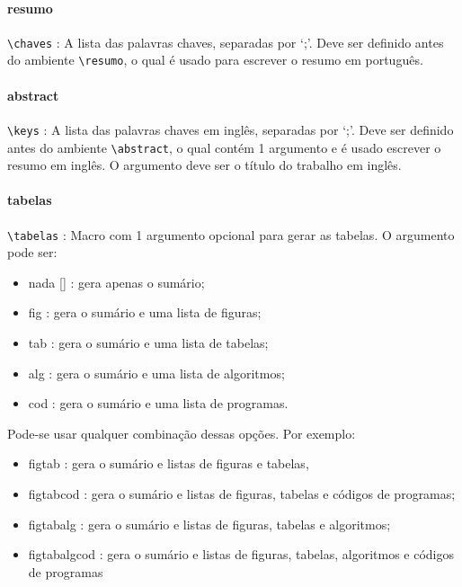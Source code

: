 \paragraph{resumo\\}
\verb|\chaves| : A lista das palavras chaves, separadas por `;'. Deve ser definido antes do ambiente \verb|\resumo|, o qual é usado para escrever o resumo em português.

\paragraph{abstract\\}
\verb|\keys| : A lista das palavras chaves em inglês, separadas por `;'. Deve ser definido antes do ambiente \verb|\abstract|, o qual contém 1 argumento e é usado escrever o resumo em inglês. O argumento deve ser o título do trabalho em inglês.

\paragraph{tabelas\\}
\verb|\tabelas| : Macro com 1 argumento opcional para gerar as tabelas. O argumento pode ser:
\begin{itemize}
 \item nada [] : gera apenas o sumário;
 \item \textsf{fig} : gera o sumário e uma lista de figuras;
 \item \textsf{tab} : gera o sumário e uma lista de tabelas;
 \item \textsf{alg} : gera o sumário e uma lista de algoritmos;
 \item \textsf{cod} : gera o sumário e uma lista de programas.
\end{itemize}

Pode-se usar qualquer combinação dessas opções. Por exemplo:
\begin{itemize}
 \item \textsf{figtab} : gera o sumário e listas de figuras e tabelas,
 \item \textsf{figtabcod} : gera o sumário e listas de figuras, tabelas e códigos de programas;
 \item \textsf{figtabalg} : gera o sumário e listas de figuras, tabelas e algoritmos;
 \item \textsf{figtabalgcod} : gera o sumário e listas de figuras, tabelas, algoritmos e códigos de programas
\end{itemize}

